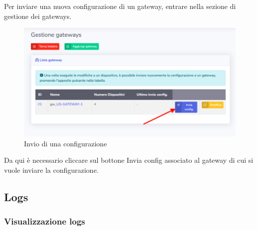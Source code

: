 		Per inviare una nuova configurazione di un gateway, entrare nella sezione di gestione dei gateways.

		\begin{figure}[H]
		\centering
		\includegraphics[scale=0.600]{res/images/admin/inviaConfig.png}
		\caption{Invio di una configurazione}
	\end{figure}

		Da qui è necessario cliccare sul bottone Invia config associato al gateway di cui si vuole inviare la configurazione.


\subsection{Logs}
	
	\subsubsection{Visualizzazione logs}

